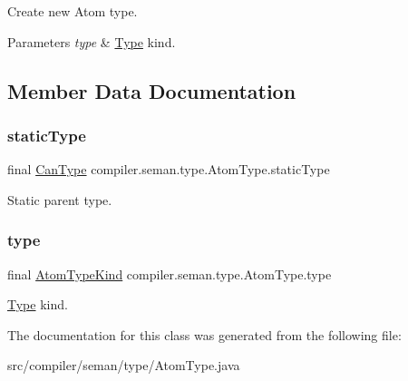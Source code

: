 Create new Atom type. 
\begin{DoxyParams}{Parameters}
{\em type} & \hyperlink{classcompiler_1_1seman_1_1type_1_1_type}{Type} kind. \\
\hline
\end{DoxyParams}


\subsection{Member Data Documentation}
\mbox{\label{classcompiler_1_1seman_1_1type_1_1_atom_type_af822b5cb4cb7d9ae5de8a373c14e6656}} 
\subsubsection{\texorpdfstring{static\+Type}{staticType}}
{\footnotesize\ttfamily final \hyperlink{classcompiler_1_1seman_1_1type_1_1_can_type}{Can\+Type} compiler.\+seman.\+type.\+Atom\+Type.\+static\+Type}

Static parent type. \mbox{\label{classcompiler_1_1seman_1_1type_1_1_atom_type_af4ae9198f0cfb5fef748ea2730ef2dcf}} 
\subsubsection{\texorpdfstring{type}{type}}
{\footnotesize\ttfamily final \hyperlink{enumcompiler_1_1abstr_1_1tree_1_1_atom_type_kind}{Atom\+Type\+Kind} compiler.\+seman.\+type.\+Atom\+Type.\+type}

\hyperlink{classcompiler_1_1seman_1_1type_1_1_type}{Type} kind. 

The documentation for this class was generated from the following file\+:\begin{DoxyCompactItemize}
\item 
src/compiler/seman/type/Atom\+Type.\+java\end{DoxyCompactItemize}
